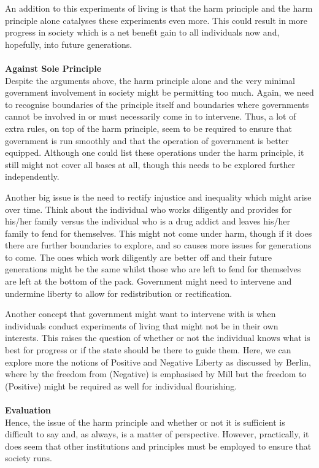 \documentclass[12pt, letterpaper]{article}
\begin{document}
An addition to this experiments of living is that the harm principle and the harm principle alone catalyses these experiments even more. This could result in more progress in society which is a net benefit gain to all individuals now and, hopefully, into future generations.
\\\\
\textbf{Against Sole Principle}
\\
Despite the arguments above, the harm principle alone and the very minimal government involvement in society might be permitting too much. Again, we need to recognise boundaries of the principle itself and boundaries where governments cannot be involved in or must necessarily come in to intervene. Thus, a lot of extra rules, on top of the harm principle, seem to be required to ensure that government is run smoothly and that the operation of government is better equipped. Although one could list these operations under the harm principle, it still might not cover all bases at all, though this needs to be explored further independently.

Another big issue is the need to rectify injustice and inequality which might arise over time. Think about the individual who works diligently and provides for his/her family versus the individual who is a drug addict and leaves his/her family to fend for themselves. This might not come under harm, though if it does there are further boundaries to explore, and so causes more issues for generations to come. The ones which work diligently are better off and their future generations might be the same whilst those who are left to fend for themselves are left at the bottom of the pack. Government might need to intervene and undermine liberty to allow for redistribution or rectification.

Another concept that government might want to intervene with is when individuals conduct experiments of living that might not be in their own interests. This raises the question of whether or not the individual knows what is best for progress or if the state should be there to guide them. Here, we can explore more the notions of Positive and Negative Liberty as discussed by Berlin, where by the freedom from (Negative) is emphasised by Mill but the freedom to (Positive) might be required as well for individual flourishing.
\\\\
\textbf{Evaluation}
\\
Hence, the issue of the harm principle and whether or not it is sufficient is difficult to say and, as always, is a matter of perspective. However, practically, it does seem that other institutions and principles must be employed to ensure that society runs.
\end{document}

